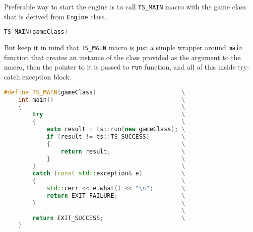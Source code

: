 Preferable way to start the engine is to call \texttt{TS\_MAIN} macro with the game class that is derived from \texttt{Engine} class. 
\begin{lstlisting}[language=c++, caption=Start of the example game (./game/game.cpp)]
TS_MAIN(gameClass)
\end{lstlisting}
But keep it in mind that \texttt{TS\_MAIN} macro is just a simple wrapper around \texttt{main} function that creates an instance of the class provided as the argument to the macro, then the pointer to it is passed to \texttt{run} function, and all of this inside try-catch exception block.
\begin{lstlisting}[language=c++, caption=\texttt{TS\_MAIN} definition (./engine/include/tsengine/core.h)]
#define TS_MAIN(gameClass)                        \
    int main()                                    \
    {                                             \
        try                                       \
        {                                         \
            auto result = ts::run(new gameClass); \
            if (result != ts::TS_SUCCESS)         \
            {                                     \
                return result;                    \
            }                                     \
        }                                         \
        catch (const std::exception& e)           \
        {                                         \
            std::cerr << e.what() << "\n";        \
            return EXIT_FAILURE;                  \
        }                                         \
                                                  \
        return EXIT_SUCCESS;                      \
    }
\end{lstlisting}

